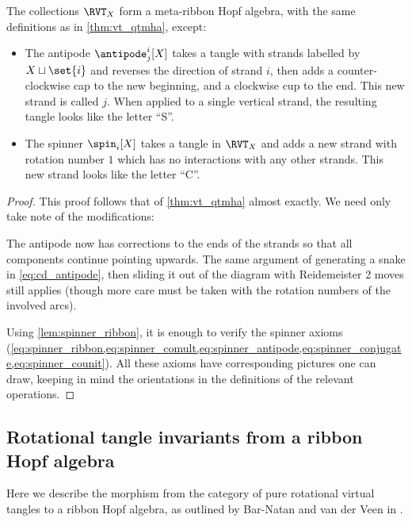 \begin{theorem}
        \label{thm:rvt_metaHopf}
        The collections $\RVT_X$ form a meta-ribbon Hopf algebra, with the same
        definitions as in \cref{thm:vt_qtmha}, except:
        \begin{itemize}
                \item The antipode $\antipode^{i}_{j}[X]$ takes a tangle with
                        strands labelled by $X \sqcup \set{i}$ and reverses the
                        direction of strand $i$, then adds a counter-clockwise
                        cap to the new beginning, and a clockwise cup to the
                        end. This new strand is called $j$. When applied to a
                        single vertical strand, the resulting tangle looks like
                        the letter \enquote{S}.
                \item The spinner $\spin_i[X]$ takes a tangle in $\RVT_X$ and
                        adds a new strand with rotation number $1$ which has no
                        interactions with any other strands. This new strand
                        looks like the letter \enquote{C}.
        \end{itemize}
\end{theorem}
\begin{proof}
        This proof follows that of \cref{thm:vt_qtmha} almost exactly. We need
        only take note of the modifications:
        
        The antipode now has corrections to the ends of the strands so that all
        components continue pointing upwards. The same argument of generating a
        snake in \cref{eq:cd_antipode}, then sliding it out of the diagram with
        Reidemeister 2 moves still applies (though more care must be taken with
        the rotation numbers of the involved arcs).

        Using \cref{lem:spinner_ribbon}, it is enough to verify the spinner
        axioms
        (\cref{eq:spinner_ribbon,eq:spinner_comult,eq:spinner_antipode,eq:spinner_conjugate,eq:spinner_counit}).
        All these axioms have corresponding pictures one can draw, keeping in
        mind the orientations in the definitions of the relevant operations.
\end{proof}

\subsection{Rotational tangle invariants from a ribbon Hopf algebra}
Here we describe the morphism from the category of pure rotational virtual
tangles to a ribbon Hopf algebra, as outlined by Bar-Natan and van der Veen in
\cite{BV}.

